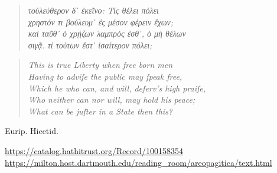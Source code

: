 \vspace*{\fill}

\begin{quote}
    \small\itshape
    \textgreek{
        τοὐλεύθερον δ᾽ ἐκεῖνο: Τίς θέλει πόλει \\
        χρηστόν τι βούλευμ᾽ ἐς μέσον φέρειν ἔχων; \\
        καὶ ταῦθ᾽ ὁ χρῄζων λαμπρός ἐσθ᾽, ὁ μὴ θέλων \\
        σιγᾷ. τί τούτων ἔστ᾽ ἰσαίτερον πόλει;
    }
\end{quote}

\begin{quote}
    \itshape
    This is true Liberty when free born men \\
    Having to adviſe the public may ſpeak free, \\
    Which he who can, and will, deſerv's high praiſe, \\
    Who neither can nor will, may hold his peace; \\
    What can be juſter in a State then this?
\end{quote}

\hfill Eurip. Hicetid. \footnotemark


\vspace{8\baselineskip}

\begin{center}
    \small
    \url{https://catalog.hathitrust.org/Record/100158354} \\
    \url{https://milton.host.dartmouth.edu/reading_room/areopagitica/text.html}
\end{center}
